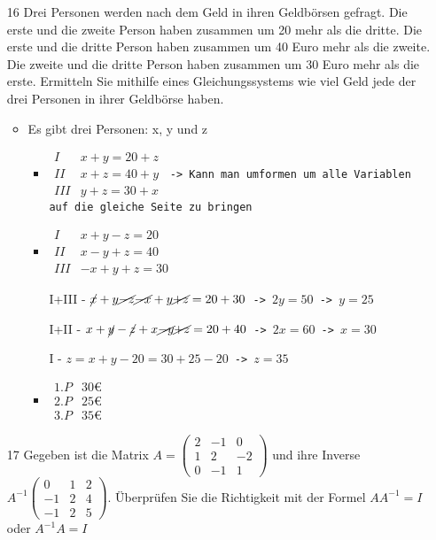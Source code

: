 \documentclass{article}
\begin{document}
\begin{itemize}
\begin{itemize}
		\end{itemize}
		\item[16]{Drei Personen werden nach dem Geld in ihren Geldbörsen gefragt. Die erste und die zweite Person haben zusammen um 20 mehr als die dritte. Die erste und die dritte Person haben zusammen um 40 Euro mehr als die zweite. Die zweite und die dritte Person haben zusammen um 30 Euro mehr als die erste. Ermitteln Sie mithilfe eines Gleichungssystems wie viel Geld jede der drei Personen in ihrer Geldbörse haben.}
		\begin{itemize}
			\item{Es gibt drei Personen: x, y und z}
			\begin{itemize}
				\item{$\begin{matrix} I & x+y=20+z \\ II & x+z=40+y \\ III & y+z=30+x \end{matrix}$\texttt{ -> Kann man umformen um alle Variablen auf die gleiche Seite zu bringen}}
				\item{$\begin{matrix} I & x+y-z=20 \\ II & x-y+z=40 \\ III & -x+y+z=30 \end{matrix}$}
				\item[I+III - ]{$\cancel{x}+y\cancel{-z}\cancel{-x}+y\cancel{+z}=20+30$\texttt{ -> }$2y=50$\texttt{ -> }$y=25$}
				\item[I+II - ]{$x+\cancel{y}-\cancel{z}+x\cancel{-y}\cancel{+z}=20+40$\texttt{ -> }$2x=60$\texttt{ -> }$x=30$}
				\item[I - ]{$z=x+y-20=30+25-20$\texttt{ -> }$z=35$}
				\item{$\begin{matrix} 1.P & 30€ \\ 2.P & 25€ \\ 3.P & 35€ \end{matrix}$}
			\end{itemize}
		\end{itemize}
		\item[17]{Gegeben ist die Matrix $A=\begin{pmatrix} 2 & -1 & 0 \\ 1 & 2 & -2 \\ 0 & -1 & 1 \end{pmatrix}$ und ihre Inverse $A^{-1}\begin{pmatrix} 0 & 1 & 2 \\ -1 & 2 & 4 \\ -1 & 2 & 5 \end{pmatrix}$. Überprüfen Sie die Richtigkeit mit der Formel $AA^{-1}=I$ oder $A^{-1}A=I$}

\end{itemize}
\end{document}
